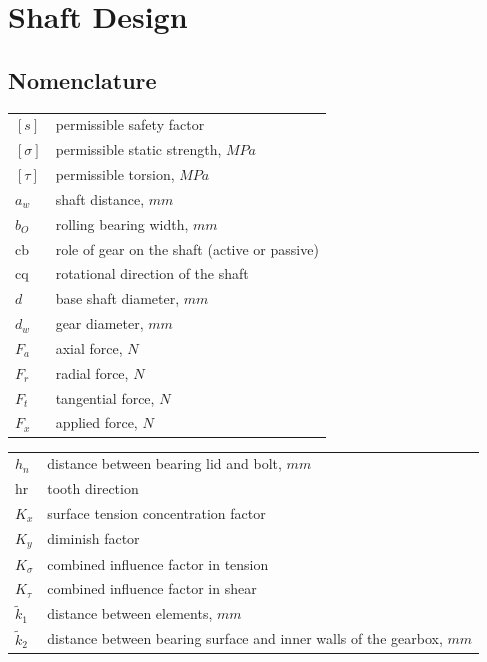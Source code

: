 \chapter{Shaft Design}
\section{Nomenclature}
\begin{tabular}[t]{lp{6.5cm}}
	$ [s] $ & permissible safety factor\\
	$ [\sigma] $ & permissible static strength, $ \unit{MPa} $\\
	$ [\tau] $ & permissible torsion, $ \unit{MPa} $\\
	$ a_w $ & shaft distance, $ \unit{mm} $\\
	$ b_O $ & rolling bearing width, $ \unit{mm}$\\
	$ \text{cb} $ & role of gear on the shaft (active or passive)\\
	$ \text{cq} $ & rotational direction of the shaft\\
	$ d $ & base shaft diameter, $ \unit{mm} $\\
	$ d_w $ & gear diameter, $ \unit{mm} $\\
	$ F_a $ & axial force, $ \unit{N} $\\
	$ F_r $ & radial force, $ \unit{N} $\\
	$ F_t $ & tangential force, $ \unit{N} $\\
	$ F_x $ & applied force, $ \unit{N} $\\	
\end{tabular}
\begin{tabular}[t]{lp{6.5cm}}
	$ h_n $ & distance between bearing lid and bolt, $ \unit{mm} $\\
	$ \text{hr} $ & tooth direction\\
	$ K_x $ & surface tension concentration factor\\
	$ K_y $ & diminish factor\\
	$ K_\sigma $ & combined influence factor in tension\\
	$ K_\tau $ & combined influence factor in shear\\
	$ \tilde{k}_1 $ & distance between elements, $ \unit{mm} $\\
	$ \tilde{k}_2 $ & distance between bearing surface and inner walls of the gearbox, $ \unit{mm} $\\
\end{tabular}\newpage
